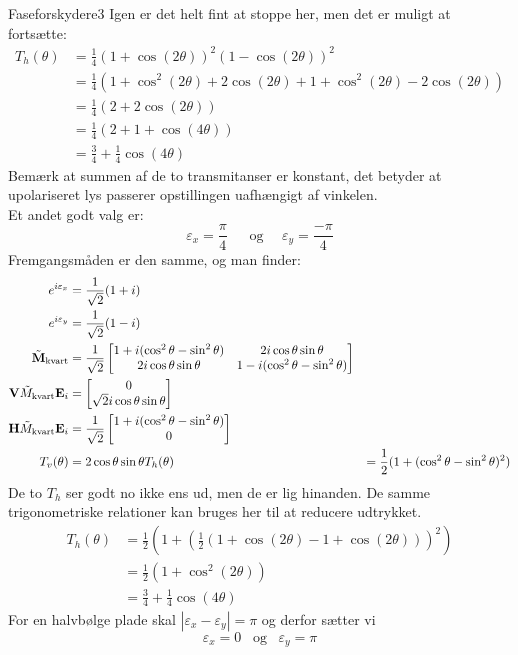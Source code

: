 \begin{opgave}{Faseforskydere}{3}
Igen er det helt fint at stoppe her, men det er muligt at fortsætte:
\begin{align*}
T_h(\theta) &= \frac{1}{4}(1+\cos(2\theta))^2(1-\cos(2\theta))^2
\\&=
\frac{1}{4}(1+\cos^2(2\theta)+2\cos(2\theta)+1+\cos^2(2\theta)-2\cos(2\theta))
\\&=
\frac{1}{4}(2+2\cos(2\theta))
\\&=
\frac{1}{4}(2+1+\cos(4\theta))
\\&=
\frac{3}{4}+\frac{1}{4}\cos(4\theta)
\end{align*}
Bemærk at summen af de to transmitanser er konstant, det betyder at upolariseret lys passerer opstillingen uafhængigt af vinkelen.\\
Et andet godt valg er:
$$
\varepsilon_x = \frac{\pi}{4}~~~~~~~\text{og}~~~~~~\varepsilon_y = \frac{-\pi}{4}
$$
Fremgangsmåden er den samme, og man finder:
\begin{align*}
e^{i\varepsilon_x} &= \frac{1}{\sqrt{2}}(1+i)\\
e^{i\varepsilon_y} &= \frac{1}{\sqrt{2}}(1-i)\\
\tilde{\mathbf{M}}_\text{kvart} &= \frac{1}{\sqrt{2}}\begin{bmatrix}
1+i(\cos^2\theta-\sin^2\theta)&2i\cos\theta\sin\theta\\
2i\cos\theta\sin\theta&1-i(\cos^2\theta-\sin^2\theta)
\end{bmatrix}\\
\mathbf{V}\tilde{M}_\text{kvart}\mathbf{E}_i &= \begin{bmatrix} 0 \\ \sqrt{2}i\cos\theta\sin\theta \end{bmatrix}\\
\mathbf{H}\tilde{M}_\text{kvart}\mathbf{E}_i &= \frac{1}{\sqrt{2}}\begin{bmatrix} 1+i(\cos^2\theta-\sin^2\theta) \\ 0 \end{bmatrix}\\
T_v(\theta)&= 2\cos\theta\sin\theta
T_h(\theta) &= \frac{1}{2}(1+(\cos^2\theta-\sin^2\theta)^2)
\end{align*}
De to $T_h$ ser godt no ikke ens ud, men de er lig hinanden. De samme trigonometriske relationer kan bruges her til at reducere udtrykket.
\begin{align*}
T_h(\theta) &= \frac{1}{2}(1+\left(\frac{1}{2}(1+\cos(2\theta)-1+\cos(2\theta))\right)^2)\\
&= \frac{1}{2}(1+\cos^2(2\theta))\\
&= \frac{3}{4}+\frac{1}{4}\cos(4\theta)
\end{align*}
\opg For en halvbølge plade skal $|\varepsilon_x-\varepsilon_y| = \pi$ og derfor sætter vi 
\begin{equation}
\varepsilon_x = 0 \,\,\,\,\, \text{og} \,\,\,\,\, \varepsilon_y = \pi 

\end{equation}
\end{opgave}
